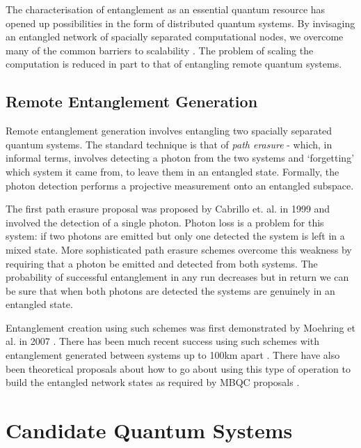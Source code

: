 The characterisation of entanglement as an essential quantum resource has opened up possibilities in the form of distributed quantum systems. By invisaging an entangled network of spacially separated computational nodes, we overcome many of the common barriers to scalability \cite{distributed_qip_review}. The problem of scaling the computation is reduced in part to that of entangling remote quantum systems.

\subsection{Remote Entanglement Generation}\label{remote_entanglement_generation}

Remote entanglement generation involves entangling two spacially separated quantum systems. The standard technique is that of \textit{path erasure} - which, in informal terms, involves detecting a photon from the two systems and `forgetting' which system it came from, to leave them in an entangled state. Formally, the photon detection performs a projective measurement onto an entangled subspace.

The first path erasure proposal was proposed by Cabrillo et. al. \cite{basic_path_erasure} in 1999 and involved the detection of a single photon. Photon loss is a problem for this system: if two photons are emitted but only one detected the system is left in a mixed state. More sophisticated path erasure schemes \cite{double_hearald_1, double_hearald_2, barrett+kok, double_hearald_3} overcome this weakness by requiring that a photon be emitted and detected from both systems. The probability of successful entanglement in any run decreases but in return we can be sure that when both photons are detected the systems are genuinely in an entangled state. 

Entanglement creation using such schemes was first demonstrated by Moehring et al. in 2007 \cite{Moehring:2007p6099}. There has been much recent success using such schemes with entanglement generated between systems up to 100km apart \cite{entanglement_97km_08, entanglement_144km_07}. There have also been theoretical proposals about how to go about using this type of operation to build the entangled network states as required by MBQC proposals \cite{Benjamin:2006p6123}.


\section{Candidate Quantum Systems}

